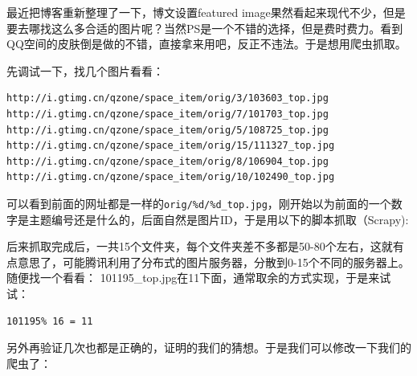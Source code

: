 \documentclass[12pt]{article}
\begin{document}
\makeblogtitle

最近把博客重新整理了一下，博文设置featured image果然看起来现代不少，但是要去哪找这么多合适的图片呢？当然PS是一个不错的选择，但是费时费力。看到QQ空间的皮肤倒是做的不错，直接拿来用吧，反正不违法。于是想用爬虫抓取。

先调试一下，找几个图片看看：

\begin{verbatim}
http://i.gtimg.cn/qzone/space_item/orig/3/103603_top.jpg
http://i.gtimg.cn/qzone/space_item/orig/7/101703_top.jpg
http://i.gtimg.cn/qzone/space_item/orig/5/108725_top.jpg
http://i.gtimg.cn/qzone/space_item/orig/15/111327_top.jpg
http://i.gtimg.cn/qzone/space_item/orig/8/106904_top.jpg
http://i.gtimg.cn/qzone/space_item/orig/10/102490_top.jpg
\end{verbatim}

可以看到前面的网址都是一样的\texttt{orig/\%d/\%d\_top.jpg}，刚开始以为前面的一个数字是主题编号还是什么的，后面自然是图片ID，于是用以下的脚本抓取（Scrapy):

\begin{Shaded}
\begin{Highlighting}[]
\NormalTok{):}
     \NormalTok{(}\NormalTok{, }\NormalTok{):}
         \NormalTok{(}\NormalTok{, }\NormalTok{):}
\OperatorTok{=} \StringTok{/} \OperatorTok{\%}
            \OperatorTok{=}\OperatorTok{=}
\end{Highlighting}
\end{Shaded}

后来抓取完成后，一共15个文件夹，每个文件夹差不多都是50-80个左右，这就有点意思了，可能腾讯利用了分布式的图片服务器，分散到0-15个不同的服务器上。随便找一个看看： 101195\_top.jpg在11下面，通常取余的方式实现，于是来试试：

\begin{verbatim}
101195% 16 = 11
\end{verbatim}

另外再验证几次也都是正确的，证明的我们的猜想。于是我们可以修改一下我们的爬虫了：
\end{document}
